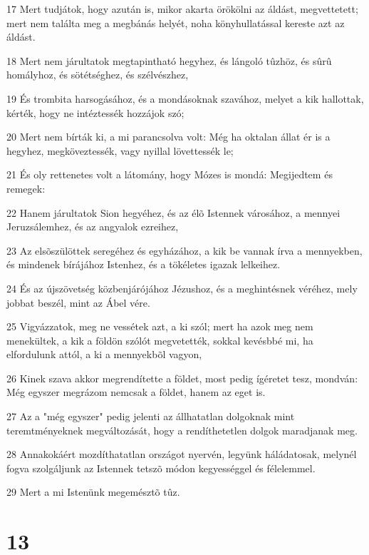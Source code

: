 \par 17 Mert tudjátok, hogy azután is, mikor akarta örökölni az áldást, megvettetett; mert nem találta meg a megbánás helyét, noha könyhullatással kereste azt az áldást.
\par 18 Mert nem járultatok megtapintható hegyhez, és lángoló tûzhöz, és sûrû homályhoz, és sötétséghez, és szélvészhez,
\par 19 És trombita harsogásához, és a mondásoknak szavához, melyet a kik hallottak, kérték, hogy ne intéztessék hozzájok szó;
\par 20 Mert nem bírták ki, a mi parancsolva volt: Még ha oktalan állat ér is a hegyhez, megköveztessék, vagy nyillal lövettessék le;
\par 21 És oly rettenetes volt a látomány, hogy Mózes is mondá: Megijedtem és remegek:
\par 22 Hanem járultatok Sion hegyéhez, és az élõ Istennek városához, a mennyei Jeruzsálemhez, és az angyalok ezreihez,
\par 23 Az elsõszülöttek seregéhez és egyházához, a kik be vannak írva a mennyekben, és mindenek bírájához Istenhez, és a tökéletes igazak lelkeihez.
\par 24 És az újszövetség közbenjárójához Jézushoz, és a meghintésnek véréhez, mely jobbat beszél, mint az Ábel vére.
\par 25 Vigyázzatok, meg ne vessétek azt, a ki szól; mert ha azok meg nem menekültek, a kik a földön szólót megvetették, sokkal kevésbbé mi, ha elfordulunk attól, a ki a mennyekbõl vagyon,
\par 26 Kinek szava akkor megrendítette a földet, most pedig ígéretet tesz, mondván: Még egyszer megrázom nemcsak a földet, hanem az eget is.
\par 27 Az a "még egyszer" pedig jelenti az állhatatlan dolgoknak mint teremtményeknek megváltozását, hogy a rendíthetetlen dolgok maradjanak meg.
\par 28 Annakokáért mozdíthatatlan országot nyervén, legyünk háládatosak, melynél fogva szolgáljunk az Istennek tetszõ módon kegyességgel és félelemmel.
\par 29 Mert a mi Istenünk megemésztõ tûz.

\chapter{13}

